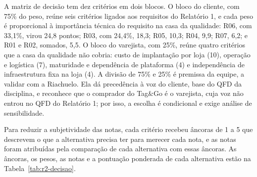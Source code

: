 A matriz de decisão tem dez critérios em dois blocos. O bloco do cliente, com 75\% do peso, reúne seis critérios ligados aos requisitos do Relatório 1, e cada peso é proporcional à importância técnica do requisito na casa da qualidade: R06, com 33,1\%, virou 24,8 pontos; R03, com 24,4\%, 18,3; R05, 10,3; R04, 9,9; R07, 6,2; e R01 e R02, somados, 5,5. O bloco do varejista, com 25\%, reúne quatro critérios que a casa da qualidade não cobria: custo de implantação por loja (10), operação e logística (7), maturidade e dependência de plataforma (4) e independência de infraestrutura fixa na loja (4). A divisão de 75\% e 25\% é premissa da equipe, a validar com a Riachuelo. Ela dá precedência à voz do cliente, base do QFD da disciplina, e reconhece que o comprador do Tag\&Go é o varejista, cuja voz não entrou no QFD do Relatório 1; por isso, a escolha é condicional e exige análise de sensibilidade.

Para reduzir a subjetividade das notas, cada critério recebeu âncoras de 1 a 5 que descrevem o que a alternativa precisa ter para merecer cada nota, e as notas foram atribuídas pela comparação de cada alternativa com essas âncoras. As âncoras, os pesos, as notas e a pontuação ponderada de cada alternativa estão na Tabela~\ref{tab:r2-decisao}.

